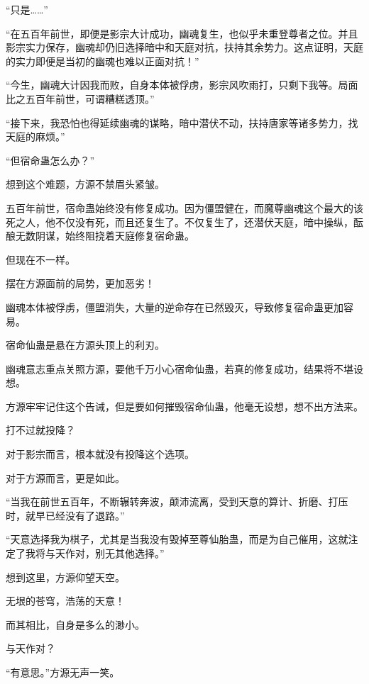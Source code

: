 \begin{this_body}
“只是……”

“在五百年前世，即便是影宗大计成功，幽魂复生，也似乎未重登尊者之位。并且影宗实力保存，幽魂却仍旧选择暗中和天庭对抗，扶持其余势力。这点证明，天庭的实力即便是当初的幽魂也难以正面对抗！”

“今生，幽魂大计因我而败，自身本体被俘虏，影宗风吹雨打，只剩下我等。局面比之五百年前世，可谓糟糕透顶。”

“接下来，我恐怕也得延续幽魂的谋略，暗中潜伏不动，扶持唐家等诸多势力，找天庭的麻烦。”

“但宿命蛊怎么办？”

想到这个难题，方源不禁眉头紧皱。

五百年前世，宿命蛊始终没有修复成功。因为僵盟健在，而魔尊幽魂这个最大的该死之人，他不仅没有死，而且还复生了。不仅复生了，还潜伏天庭，暗中操纵，酝酿无数阴谋，始终阻挠着天庭修复宿命蛊。

但现在不一样。

摆在方源面前的局势，更加恶劣！

幽魂本体被俘虏，僵盟消失，大量的逆命存在已然毁灭，导致修复宿命蛊更加容易。

宿命仙蛊是悬在方源头顶上的利刃。

幽魂意志重点关照方源，要他千万小心宿命仙蛊，若真的修复成功，结果将不堪设想。

方源牢牢记住这个告诫，但是要如何摧毁宿命仙蛊，他毫无设想，想不出方法来。

打不过就投降？

对于影宗而言，根本就没有投降这个选项。

对于方源而言，更是如此。

“当我在前世五百年，不断辗转奔波，颠沛流离，受到天意的算计、折磨、打压时，就早已经没有了退路。”

“天意选择我为棋子，尤其是当我没有毁掉至尊仙胎蛊，而是为自己催用，这就注定了我将与天作对，别无其他选择。”

想到这里，方源仰望天空。

无垠的苍穹，浩荡的天意！

而其相比，自身是多么的渺小。

与天作对？

“有意思。”方源无声一笑。

\end{this_body}

